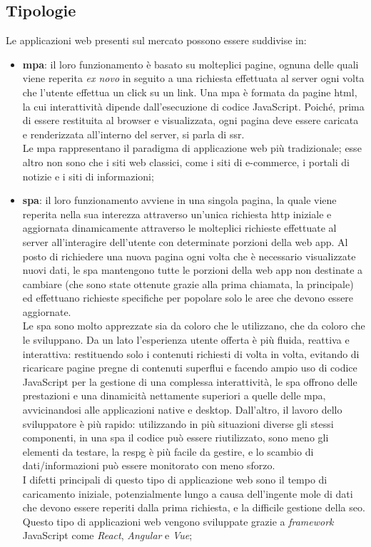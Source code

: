 \subsection{Tipologie}
\label{subsec:Tipologie}
Le applicazioni web presenti sul mercato possono essere suddivise in:
\begin{itemize}
  \item \textbf{\acrfull{mpa}}: il loro funzionamento è basato su molteplici pagine, ognuna delle quali viene reperita \textit{ex novo} in seguito a una richiesta effettuata al server ogni volta che l'utente effettua un click su un link. Una \acrshort{mpa} è formata da pagine \gls{html}, la cui interattività dipende dall'esecuzione di codice JavaScript. Poiché, prima di essere restituita al browser e visualizzata, ogni pagina deve essere caricata e renderizzata all'interno del server, si parla di \acrfull{ssr}.\\
  Le \acrshort{mpa} rappresentano il paradigma di applicazione web più tradizionale; esse altro non sono che i siti web classici, come i siti di e-commerce, i portali di notizie e i siti di informazioni; 

  \item \textbf{\acrfull{spa}}: il loro funzionamento avviene in una singola pagina, la quale viene reperita nella sua interezza attraverso un'unica richiesta \gls{http} iniziale e aggiornata dinamicamente attraverso le molteplici richieste effettuate al server all'interagire dell'utente con determinate porzioni della web app. Al posto di richiedere una nuova pagina ogni volta che è necessario visualizzate nuovi dati, le \acrshort{spa} mantengono tutte le porzioni della web app non destinate a cambiare (che sono state ottenute grazie alla prima chiamata, la principale) ed effettuano richieste specifiche per popolare solo le aree che devono essere aggiornate.\\
  Le \acrshort{spa} sono molto apprezzate sia da coloro che le utilizzano, che da coloro che le sviluppano. Da un lato l'esperienza utente offerta è più fluida, reattiva e interattiva: restituendo solo i contenuti richiesti di volta in volta, evitando di ricaricare pagine pregne di contenuti superflui e facendo ampio uso di codice JavaScript per la gestione di una complessa interattività, le \acrshort{spa} offrono delle prestazioni e una dinamicità nettamente superiori a quelle delle \acrshort{mpa}, avvicinandosi alle applicazioni native e desktop. Dall'altro, il lavoro dello sviluppatore è più rapido: utilizzando in più situazioni diverse gli stessi componenti, in una \acrshort{spa} il codice può essere riutilizzato, sono meno gli elementi da testare, la \gls{respg} è più facile da gestire, e lo scambio di dati/informazioni può essere monitorato con meno sforzo.\\
  I difetti principali di questo tipo di applicazione web sono il tempo di caricamento iniziale, potenzialmente lungo a causa dell'ingente mole di dati che devono essere reperiti dalla prima richiesta, e la difficile gestione della \gls{seo}.\\
  Questo tipo di applicazioni web vengono sviluppate grazie a \textit{framework} JavaScript come \textit{React}, \textit{Angular} e \textit{Vue};


\end{itemize}
